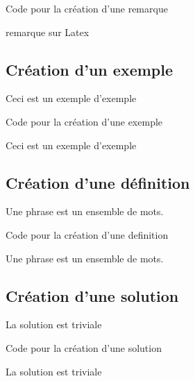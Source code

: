 {
\begin{Latex}{Code pour la création d'une remarque}
\begin{remarque}
remarque sur Latex
\end{remarque}
\end{Latex}

\subsection{Création d'un exemple}

\begin{exemple}
    Ceci est un exemple d'exemple
\end{exemple}

\begin{Latex}{Code pour la création d'une exemple}
\begin{exemple}
    Ceci est un exemple d'exemple
\end{exemple}
\end{Latex}

\subsection{Création d'une définition}

\begin{definition}
    Une phrase est un ensemble de mots.
\end{definition}

\begin{Latex}{Code pour la création d'une definition}
\begin{definition}
    Une phrase est un ensemble de mots.
\end{definition}
\end{Latex}


\subsection{Création d'une solution}

\begin{solution}
   La solution est triviale
\end{solution}

\begin{Latex}{Code pour la création d'une solution}
\begin{solution}
    La solution est triviale
\end{solution}
\end{Latex}



}
